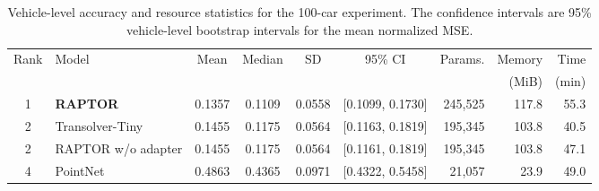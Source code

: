 \begin{table}[t]
\centering
\caption{Vehicle-level accuracy and resource statistics for the 100-car experiment. The confidence intervals are 95\% vehicle-level bootstrap intervals for the mean normalized MSE.}
\label{tab:car_summary}
\small
\begin{tabular}{clccccrrr}
\toprule
Rank & Model & Mean & Median & SD & 95\% CI & Params. & Memory & Time \\
 & & & & & & & (MiB) & (min) \\
\midrule
1 & \textbf{RAPTOR} & 0.1357 & 0.1109 & 0.0558 & [0.1099, 0.1730] & 245,525 & 117.8 & 55.3 \\
2 & Transolver-Tiny & 0.1455 & 0.1175 & 0.0564 & [0.1163, 0.1819] & 195,345 & 103.8 & 40.5 \\
2 & RAPTOR w/o adapter & 0.1455 & 0.1175 & 0.0564 & [0.1161, 0.1819] & 195,345 & 103.8 & 47.1 \\
4 & PointNet & 0.4863 & 0.4365 & 0.0971 & [0.4322, 0.5458] & 21,057 & 23.9 & 49.0 \\
\bottomrule
\end{tabular}
\end{table}